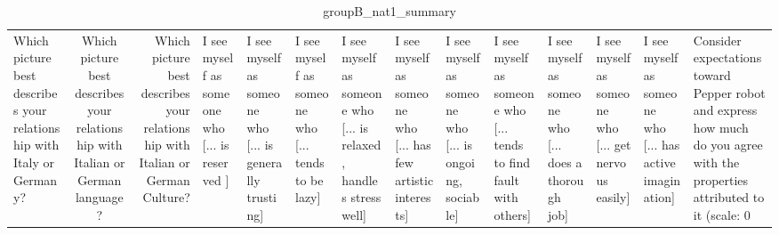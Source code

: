 \begin{table}
\caption{groupB_nat1_summary}
\label{tab:groupB_nat1_summary}
\begin{tabular}{lcr}
\toprule
Which picture best describes your relationship with Italy or Germany? & Which picture best describes your relationship with Italian or German language? & Which picture best describes your relationship with Italian or German Culture? & I see myself as someone who  [... is reserved ] & I see myself as someone who  [... is generally trusting] & I see myself as someone who  [... tends to be lazy] & I see myself as someone who  [... is relaxed, handles stress well] & I see myself as someone who  [... has few artistic interests] & I see myself as someone who  [... is ongoing, sociable] & I see myself as someone who  [... tends to find fault with others] & I see myself as someone who  [... does a thorough job] & I see myself as someone who  [... get nervous easily] & I see myself as someone who  [... has active imagination] & Consider expectations toward Pepper robot and express how much do you agree with the properties attributed to it (scale: 0%
\end{tabular}
\end{table}

